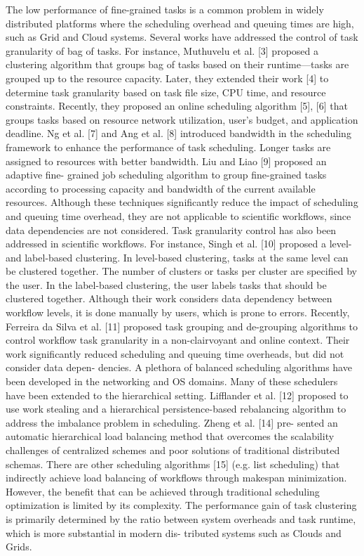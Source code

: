 \documentclass[final,5p,times,twocolumn]{elsarticle}
\begin{document}
The low performance of fine-grained tasks is a common problem in widely distributed platforms where the scheduling overhead and queuing times are high, such as Grid and Cloud systems. Several works have addressed the control of task granularity of bag of tasks. For instance, Muthuvelu et al. [3] proposed a clustering algorithm that groups bag of tasks based on their runtime—tasks are grouped up to the resource capacity. Later, they extended their work [4] to determine task granularity based on task file size, CPU time, and resource constraints. Recently, they proposed an online scheduling algorithm [5], [6] that groups tasks based on resource network utilization, user’s budget, and application deadline. Ng et al. [7] and Ang et al. [8] introduced bandwidth in the scheduling framework to enhance the performance of task scheduling. Longer tasks are assigned to resources with better bandwidth. Liu and Liao [9] proposed an adaptive fine- grained job scheduling algorithm to group fine-grained tasks according to processing capacity and bandwidth of the current available resources. Although these techniques significantly reduce the impact of scheduling and queuing time overhead, they are not applicable to scientific workflows, since data dependencies are not considered.
Task granularity control has also been addressed in scientific workflows. For instance, Singh et al. [10] proposed a level- and label-based clustering. In level-based clustering, tasks at the same level can be clustered together. The number of clusters or tasks per cluster are specified by the user. In the label-based clustering, the user labels tasks that should be clustered together. Although their work considers data dependency between workflow levels, it is done manually by users, which is prone to errors. Recently, Ferreira da Silva et al. [11] proposed task grouping and de-grouping algorithms to control workflow task granularity in a non-clairvoyant and online context. Their work significantly reduced scheduling and queuing time overheads, but did not consider data depen- dencies.
A plethora of balanced scheduling algorithms have been developed in the networking and OS domains. Many of these schedulers have been extended to the hierarchical setting. Lifflander et al. [12] proposed to use work stealing and a hierarchical persistence-based rebalancing algorithm to address the imbalance problem in scheduling. Zheng et al. [14] pre- sented an automatic hierarchical load balancing method that overcomes the scalability challenges of centralized schemes and poor solutions of traditional distributed schemas. There are other scheduling algorithms [15] (e.g. list scheduling)
that indirectly achieve load balancing of workflows through makespan minimization. However, the benefit that can be achieved through traditional scheduling optimization is limited by its complexity. The performance gain of task clustering is primarily determined by the ratio between system overheads and task runtime, which is more substantial in modern dis- tributed systems such as Clouds and Grids.
\end{document}
